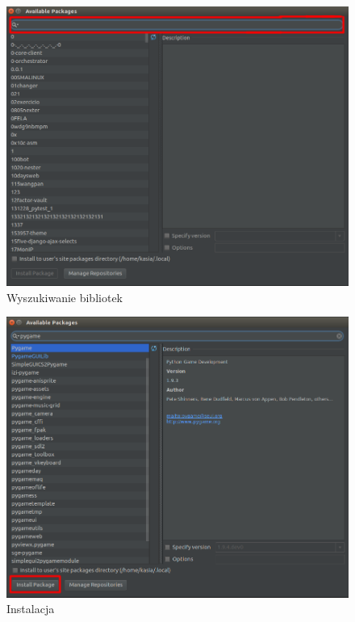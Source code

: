 \begin{figure}[h]
\centering
\includegraphics[width=13cm]{Zdjecia/5/kasia/settings5}
\caption{Wyszukiwanie bibliotek}
\label{fig:file}
\end{figure}

\begin{figure}[h]
\centering
\includegraphics[width=13cm]{Zdjecia/5/kasia/settings6}
\caption{Instalacja}
\label{fig:file}
\end{figure}